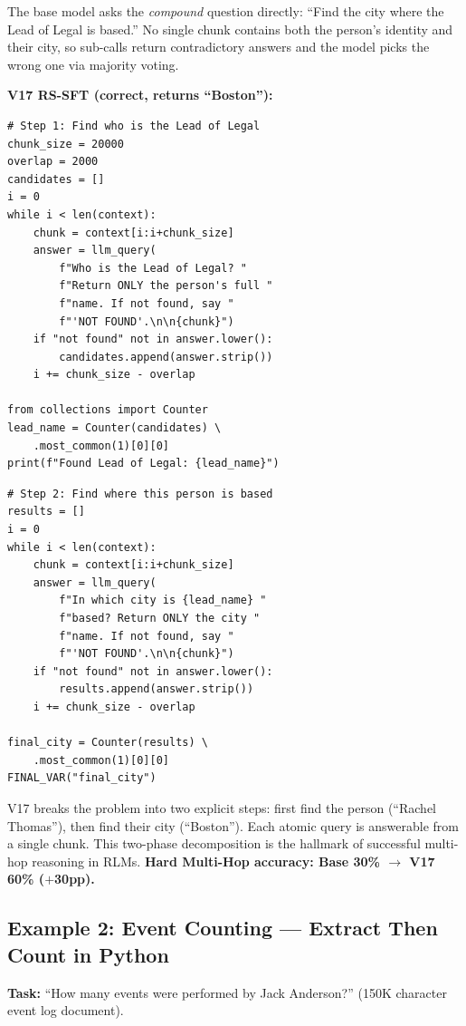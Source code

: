 \documentclass{article}
\begin{document}
The base model asks the \emph{compound} question directly: ``Find the city where the Lead of Legal is based.'' No single chunk contains both the person's identity and their city, so sub-calls return contradictory answers and the model picks the wrong one via majority voting.

\textbf{V17 RS-SFT (correct, returns ``Boston''):}
{\footnotesize
\begin{verbatim}
# Step 1: Find who is the Lead of Legal
chunk_size = 20000
overlap = 2000
candidates = []
i = 0
while i < len(context):
    chunk = context[i:i+chunk_size]
    answer = llm_query(
        f"Who is the Lead of Legal? "
        f"Return ONLY the person's full "
        f"name. If not found, say "
        f"'NOT FOUND'.\n\n{chunk}")
    if "not found" not in answer.lower():
        candidates.append(answer.strip())
    i += chunk_size - overlap

from collections import Counter
lead_name = Counter(candidates) \
    .most_common(1)[0][0]
print(f"Found Lead of Legal: {lead_name}")
\end{verbatim}
}
{\footnotesize
\begin{verbatim}
# Step 2: Find where this person is based
results = []
i = 0
while i < len(context):
    chunk = context[i:i+chunk_size]
    answer = llm_query(
        f"In which city is {lead_name} "
        f"based? Return ONLY the city "
        f"name. If not found, say "
        f"'NOT FOUND'.\n\n{chunk}")
    if "not found" not in answer.lower():
        results.append(answer.strip())
    i += chunk_size - overlap

final_city = Counter(results) \
    .most_common(1)[0][0]
FINAL_VAR("final_city")
\end{verbatim}
}

V17 breaks the problem into two explicit steps: first find the person (``Rachel Thomas''), then find their city (``Boston''). Each atomic query is answerable from a single chunk. This two-phase decomposition is the hallmark of successful multi-hop reasoning in RLMs. \textbf{Hard Multi-Hop accuracy: Base 30\% $\to$ V17 60\% ($+$30pp).}

\subsection{Example 2: Event Counting --- Extract Then Count in Python}
\label{app:traj-event}

\textbf{Task:} ``How many events were performed by Jack Anderson?'' (150K character event log document).
\end{document}
